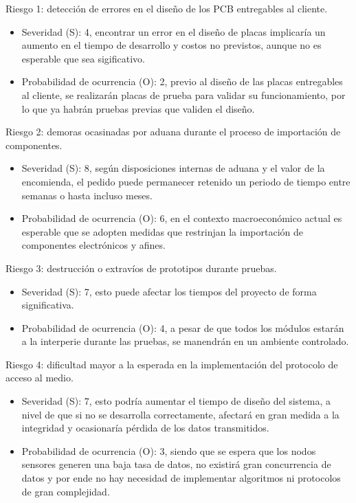 \documentclass[
11pt, %
codirector, %
]{charter}
\begin{document}
Riesgo 1: detección de errores en el diseño de los PCB entregables al cliente.
\begin{itemize}
	\item Severidad (S): 4, encontrar un error en el diseño de placas implicaría un aumento en el tiempo de desarrollo y costos no previstos, aunque no es esperable que sea sigificativo.
	\item Probabilidad de ocurrencia (O): 2, previo al diseño de las placas entregables al cliente, se realizarán placas de prueba para validar su funcionamiento, por lo que ya habrán pruebas previas que validen el diseño.
\end{itemize}   

Riesgo 2: demoras ocasinadas por aduana durante el proceso de importación de componentes.
\begin{itemize}
	\item Severidad (S): 8, según disposiciones internas de aduana y el valor de la encomienda, el pedido puede permanecer retenido un periodo de tiempo entre semanas o hasta incluso meses.
	\item Probabilidad de ocurrencia (O): 6, en el contexto macroeconómico actual es esperable que se adopten medidas que restrinjan la importación de componentes electrónicos y afines.
\end{itemize}

Riesgo 3: destrucción o extravíos de prototipos durante pruebas.
\begin{itemize}
	\item Severidad (S): 7, esto puede afectar los tiempos del proyecto de forma significativa.
	\item Probabilidad de ocurrencia (O): 4, a pesar de que todos los módulos estarán a la interperie durante las pruebas, se manendrán en un ambiente controlado.
\end{itemize}

Riesgo 4: dificultad mayor a la esperada en la implementación del protocolo de acceso al medio.
\begin{itemize}
	\item Severidad (S): 7, esto podría aumentar el tiempo de diseño del sistema, a nivel de que si no se desarrolla correctamente, afectará en gran medida a la integridad y ocasionaría pérdida de los datos transmitidos.
	\item Probabilidad de ocurrencia (O): 3, siendo que se espera que los nodos sensores generen una baja tasa de datos, no existirá gran concurrencia de datos y por ende no hay necesidad de implementar algoritmos ni protocolos de gran complejidad.
\end{itemize}
\end{document}
